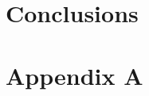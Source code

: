 \documentclass[12pt]{thesis}
\begin{document}
\chapter{Conclusions}
\chapter{Appendix A}

%
%
%
%
%
%
%
\end{document}
